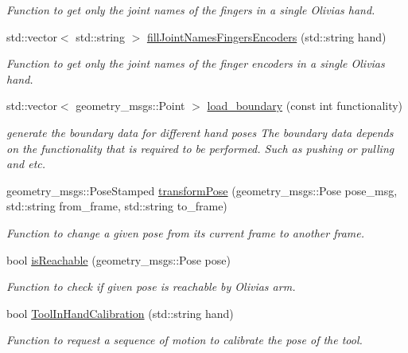 \begin{DoxyCompactItemize}
\begin{DoxyCompactList}\small\item\em Function to get only the joint names of the fingers in a single Olivia\textquotesingle{}s hand. \end{DoxyCompactList}\item 
std\+::vector$<$ std\+::string $>$ \hyperlink{structManipulate_a3cba926b57fd0e0ab0219b992504bd1c}{fill\+Joint\+Names\+Fingers\+Encoders} (std\+::string hand)
\begin{DoxyCompactList}\small\item\em Function to get only the joint names of the finger encoders in a single Olivia\textquotesingle{}s hand. \end{DoxyCompactList}\item 
std\+::vector$<$ geometry\+\_\+msgs\+::\+Point $>$ \hyperlink{structManipulate_a2aa3e3c677f9929cb4219b8785e1e225}{load\+\_\+boundary} (const int functionality)
\begin{DoxyCompactList}\small\item\em generate the boundary data for different hand poses The boundary data depends on the functionality that is required to be performed. Such as pushing or pulling and etc. \end{DoxyCompactList}\item 
geometry\+\_\+msgs\+::\+Pose\+Stamped \hyperlink{structManipulate_a54501e8b26698b01137421f7a20a4381}{transform\+Pose} (geometry\+\_\+msgs\+::\+Pose pose\+\_\+msg, std\+::string from\+\_\+frame, std\+::string to\+\_\+frame)
\begin{DoxyCompactList}\small\item\em Function to change a given pose from its current frame to another frame. \end{DoxyCompactList}\item 
bool \hyperlink{structManipulate_a5aaebe2cacce6f5bb4c28385ed4b85df}{is\+Reachable} (geometry\+\_\+msgs\+::\+Pose pose)
\begin{DoxyCompactList}\small\item\em Function to check if given pose is reachable by Olivia\textquotesingle{}s arm. \end{DoxyCompactList}\item 
bool \hyperlink{structManipulate_a118cc711fca21f8b4db0ef16b5e40022}{Tool\+In\+Hand\+Calibration} (std\+::string hand)
\begin{DoxyCompactList}\small\item\em Function to request a sequence of motion to calibrate the pose of the tool. \end{DoxyCompactList}\item 

\end{DoxyCompactItemize}
